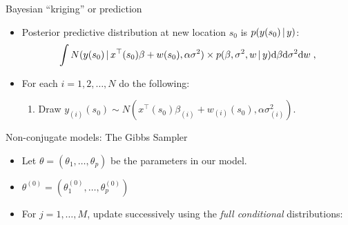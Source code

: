 \begin{frame}{Bayesian ``kriging'' or prediction}
 
 \begin{itemize}\setlength{\itemsep}{0.4cm}
  \item Posterior predictive distribution at new location $s_0$ is $p(y(s_0)\,|\, y)$:
  \[
   \int N(y(s_0)\,|\, x^{\top}(s_0)\beta + w(s_0), \alpha \sigma^2)\times p(\beta, \sigma^2, w \,|\, y)\mbox{d}\beta \mbox{d}\sigma^2\mbox{d}w\;,
  \]
  \item For each $i=1,2,\ldots,N$ do the following: 
 \begin{enumerate}\setlength{\itemsep}{0.25cm}
  \item Draw $\displaystyle y_{(i)}(s_0) \sim N(x^{\top}(s_0)\beta_{(i)} + w_{(i)}(s_0), \alpha\sigma^2_{(i)})$.
 \end{enumerate}
 \end{itemize}
 
\end{frame}


\begin{frame}{Non-conjugate models: The Gibbs Sampler}

{\small

\begin{itemize}\setlength{\itemsep}{0.4cm} 
\item Let $\theta=(\theta_1,\ldots,\theta_p)$ be the parameters in our model.

\item $\theta^{(0)}=(\theta_{1}^{(0)},\ldots,\theta_{p}^{(0)})$ 

\item For $j=1,\ldots,M$, update successively using the \emph{full conditional} distributions:
\end{itemize}
}
\end{frame}

